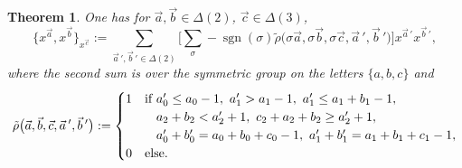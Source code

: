 \documentclass[pdftex]{sigma}
\numberwithin{equation}{section}
\newtheorem{Theorem}{Theorem}[section]
\begin{document}
\begin{Theorem}\label{main-thm} One has for $\vec{a},\vec{b}\in\Delta(2)$, $\vec{c}\in\Delta(3)$,
\begin{equation}\label{main-formula-eq}
\big\{x^{\vec{a}},x^{\vec{b}}\big\}_{x^{\vec{c}}}:=\sum_{\vec{a}\,{}',\vec{b}\,{}'\in \Delta(2)}\bigg[\sum_{\sigma}-\operatorname{sgn}(\sigma)\tilde{\rho}\big(\sigma\vec{a}, \sigma\vec{b},\sigma\vec{c},\vec{a}\,{}',\vec{b}\,{}'\big)\bigg]x^{\vec{a}\,{}'}x^{\vec{b}\,{}'},
\end{equation}
	where the second sum is over the symmetric group on the letters $\{a,b,c\}$ and
	\[\tilde{\rho}\big(\vec{a},\vec{b},\vec{c},\vec{a}\,{}',\vec{b}\,{}'\big):=\begin{cases}
  1 & \text{if} \ a_0'\leq a_0-1, \ a_1'>a_1-1,\ a_1'\leq a_1+b_1-1,\\
	
    & \hphantom{\text{if}}{}\ a_2+b_2<a_2'+1,\ c_2+a_2+b_2\geq a_2'+1,\\
	
	& \hphantom{\text{if}}{}\ a_0'+b_0'=a_0+b_0+c_0-1,\ a_1'+b_1'=a_1+b_1+c_1-1,\\
	0 & \text{else}.
\end{cases}\]
\end{Theorem}
\end{document}

